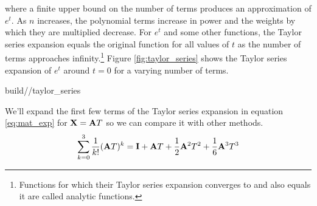 where a finite upper bound on the number of terms produces an approximation of
$e^t$. As $n$ increases, the polynomial terms increase in power and the weights
by which they are multiplied decrease. For $e^t$ and some other functions, the
Taylor series expansion equals the original function for all values of $t$ as
the number of terms approaches infinity.\footnote{Functions for which their
Taylor series expansion converges to and also equals it are called analytic
functions.} Figure \ref{fig:taylor_series} shows the Taylor series expansion of
$e^t$ around $t = 0$ for a varying number of terms.
\begin{svg}{build/\chapterpath/taylor_series}
  \caption{Taylor series expansions of $e^t$ around $t = 0$ for $n$ terms}
  \label{fig:taylor_series}
\end{svg}

We'll expand the first few terms of the Taylor series expansion in equation
\eqref{eq:mat_exp} for $\mathbf{X} = \mathbf{A}T$ so we can compare it with other
methods.
\begin{equation*}
  \sum_{k=0}^3 \frac{1}{k!} (\mathbf{A}T)^k = \mathbf{I} + \mathbf{A}T +
    \frac{1}{2}\mathbf{A}^2T^2 + \frac{1}{6}\mathbf{A}^3T^3
\end{equation*}


